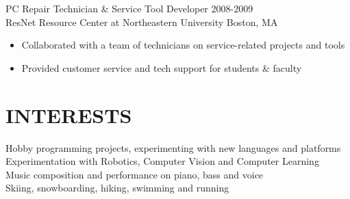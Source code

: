 \documentclass[line,margin]{res}
\begin{document}
\begin{resume}
    {\large PC Repair Technician \& Service Tool Developer}
    \hfill 2008-2009 \\
    ResNet Resource Center at Northeastern University \hfill Boston, MA
     \begin{itemize}  \itemsep -2pt %
     \item Collaborated with a team of technicians on service-related projects and tools
     \item Provided customer service and tech support for students \& faculty
    \end{itemize}

\section{INTERESTS}
    Hobby programming projects, experimenting with new languages and platforms \\
    Experimentation with Robotics, Computer Vision and Computer Learning  \\
    Music composition and performance on piano, bass and voice \\
    Skiing, snowboarding, hiking, swimming and running

\end{resume}
\end{document}
